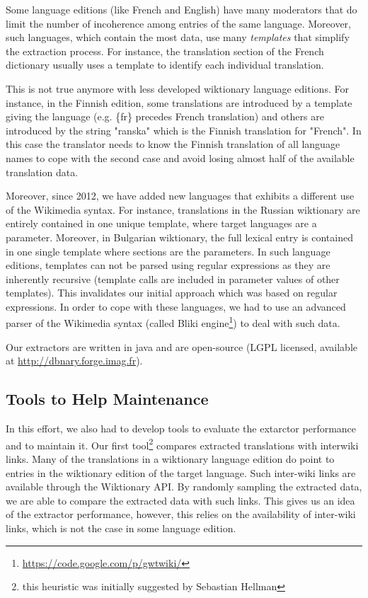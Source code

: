 \documentclass[10pt, a4paper]{article}
\begin{document}
Some language editions (like French and English) have many moderators that do limit the number of incoherence among entries of the same language. Moreover, such languages, which contain the most data, use many \textit{templates} that simplify the extraction process. For instance, the translation section of the French dictionary usually uses a template to identify each individual translation.

This is not true anymore with less developed wiktionary language editions. For instance, in the Finnish edition, some translations are introduced by a template giving the language (e.g. \{fr\} precedes French translation) and others are introduced by the string "ranska" which is the Finnish translation for "French". In this case the translator needs to know the Finnish translation of all language names to cope with the second case and avoid losing almost half of the available translation data.

Moreover, since 2012, we have added new languages that exhibits a different use of the Wikimedia syntax. For instance, translations in the Russian wiktionary are entirely contained in one unique template, where target languages are a parameter. Moreover, in Bulgarian wiktionary, the full lexical entry is contained in one single template where sections are the parameters. In such language editions, templates can not be parsed using regular expressions as they are inherently recursive (template calls are included in parameter values of other templates). This invalidates our initial approach which was based on regular expressions. In order to cope with these languages, we had to use an advanced parser of the Wikimedia syntax (called Bliki engine\footnote{\url{https://code.google.com/p/gwtwiki/}}) to deal with such data.

Our extractors are written in java and are open-source (LGPL licensed, available at \url{http://dbnary.forge.imag.fr}).

\subsection{Tools to Help Maintenance}

In this effort, we also had to develop tools to evaluate the extarctor performance and to maintain it. Our first tool\footnote{this heuristic was initially suggested by Sebastian Hellman} compares extracted translations with interwiki links. Many of the translations in a wiktionary language edition do point to entries in the wiktionary edition of the target language. Such inter-wiki links are available through the Wiktionary API. By randomly sampling the extracted data, we are able to compare the extracted data with such links. This gives us an idea of the extractor performance, however, this relies on the availability of inter-wiki links, which is not the case in some language edition.
\end{document}
